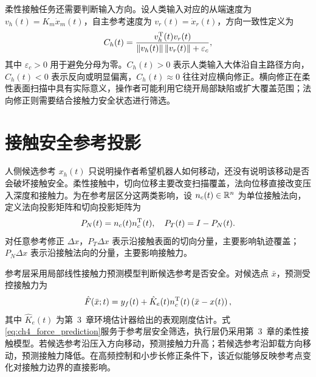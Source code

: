 柔性接触任务还需要判断输入方向。设人类输入对应的从端速度为 $v_h(t)=K_m\dot x_m(t)$，自主参考速度为 $v_r(t)=\dot x_r(t)$，方向一致性定义为
\begin{equation}
  C_h(t)=
  \frac{v_h^{\mathrm{T}}(t)v_r(t)}
  {\left\lVert v_h(t)\right\rVert\left\lVert v_r(t)\right\rVert+\varepsilon_c},
  \label{eq:ch4_direction_consistency}
\end{equation}
其中 $\varepsilon_c>0$ 用于避免分母为零。$C_h(t)>0$ 表示人类输入大体沿自主路径方向，$C_h(t)<0$ 表示反向或明显偏离，$C_h(t)\approx0$ 往往对应横向修正。横向修正在柔性表面扫描中具有实际意义，操作者可能利用它绕开局部缺陷或扩大覆盖范围；法向修正则需要结合接触力安全状态进行筛选。

\section{接触安全参考投影}
\label{sec:ch4_safe_projection}

人侧候选参考 $x_h(t)$ 只说明操作者希望机器人如何移动，还没有说明该移动是否会破坏接触安全。柔性接触中，切向位移主要改变扫描覆盖，法向位移直接改变压入深度和接触力。为在参考层区分这两类影响，设 $n_c(t)\in\mathbb{R}^n$ 为单位接触法向，定义法向投影矩阵和切向投影矩阵为
\begin{equation}
  P_N(t)=n_c(t)n_c^{\mathrm{T}}(t),
  \quad
  P_T(t)=I-P_N(t).
  \label{eq:ch4_tangent_normal_projection}
\end{equation}
对任意参考修正 $\Delta x$，$P_T\Delta x$ 表示沿接触表面的切向分量，主要影响轨迹覆盖；$P_N\Delta x$ 表示沿接触法向的分量，主要影响接触力。

参考层采用局部线性接触力预测模型判断候选参考是否安全。对候选点 $\bar x$，预测受控接触力为
\begin{equation}
  \hat F(\bar x;t)=y_f(t)+\hat K_e(t)n_c^{\mathrm{T}}(t)\left(\bar x-x(t)\right),
  \label{eq:ch4_force_prediction}
\end{equation}
其中 $\hat K_e(t)$ 为第~3~章环境估计器给出的表观刚度估计。式\eqref{eq:ch4_force_prediction}服务于参考层安全筛选，执行层仍采用第~3~章的柔性接触模型。若候选参考沿压入方向移动，预测接触力升高；若候选参考沿卸载方向移动，预测接触力降低。在高频控制和小步长修正条件下，该近似能够反映参考点变化对接触力边界的直接影响。

